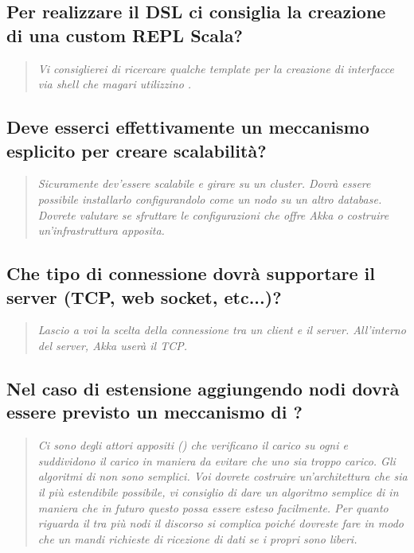 \documentclass{scalatekids-article}
\begin{document}
\subsection{Per realizzare il DSL ci consiglia la creazione di una custom REPL Scala?}
\begin{quote}
  \textit{Vi consiglierei di ricercare qualche template per la creazione di interfacce via shell che magari utilizzino .\\}
\end{quote}
\subsection{Deve esserci effettivamente un meccanismo esplicito per creare scalabilità?}
\begin{quote}
  \textit{Sicuramente dev'essere scalabile e girare su un cluster. Dovrà essere possibile installarlo configurandolo come un nodo su un altro database. Dovrete valutare se sfruttare le configurazioni che 
  offre Akka o costruire un'infrastruttura apposita.\\}
\end{quote}
\subsection{Che tipo di connessione dovrà supportare il server (TCP, web socket, etc...)?}
\begin{quote}
  \textit{Lascio a voi la scelta della connessione tra un client e il server. All'interno del server, Akka userà il TCP.\\}
\end{quote}
\subsection{Nel caso di estensione aggiungendo nodi dovrà essere previsto un meccanismo di ?}
\begin{quote}
  \textit{Ci sono degli attori appositi () che verificano il carico su ogni  e suddividono il carico in maniera da evitare che uno  sia troppo carico. 
  Gli algoritmi di  non sono semplici. Voi dovrete costruire un'architettura che sia il più estendibile possibile, vi consiglio di dare un algoritmo semplice di  in maniera che in futuro questo possa essere esteso facilmente. Per quanto riguarda il  tra più nodi il discorso si complica poiché dovreste fare in modo che un  mandi richieste di ricezione di dati se i propri  sono liberi.\\}
\end{quote}
\end{document}
